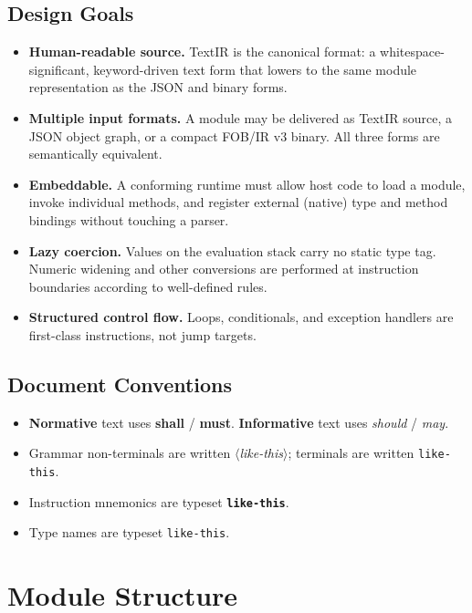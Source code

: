\documentclass[11pt,a4paper]{article}
\newcommand{\typename}[1]{\textcolor{typecolor}{\texttt{\small #1}}}
\newcommand{\opcode}[1]{\textbf{\texttt{#1}}}
\newcommand{\nterm}[1]{\textit{$\langle$#1$\rangle$}}
\newcommand{\term}[1]{\texttt{#1}}
\begin{document}
\subsection{Design Goals}

\begin{itemize}[leftmargin=1.8em]
  \item \textbf{Human-readable source.} TextIR is the canonical format: a
    whitespace-significant, keyword-driven text form that lowers to the same
    module representation as the JSON and binary forms.
  \item \textbf{Multiple input formats.} A module may be delivered as TextIR
    source, a JSON object graph, or a compact FOB/IR v3 binary. All three
    forms are semantically equivalent.
  \item \textbf{Embeddable.} A conforming runtime must allow host code to
    load a module, invoke individual methods, and register external (native)
    type and method bindings without touching a parser.
  \item \textbf{Lazy coercion.} Values on the evaluation stack carry no
    static type tag. Numeric widening and other conversions are performed
    at instruction boundaries according to well-defined rules.
  \item \textbf{Structured control flow.} Loops, conditionals, and exception
    handlers are first-class instructions, not jump targets.
\end{itemize}

\subsection{Document Conventions}

\begin{itemize}[leftmargin=1.8em]
  \item \textbf{Normative} text uses \textbf{shall} / \textbf{must}.
    \textbf{Informative} text uses \textit{should} / \textit{may}.
  \item Grammar non-terminals are written \nterm{like-this}; terminals are
    written \term{like-this}.
  \item Instruction mnemonics are typeset \opcode{like-this}.
  \item Type names are typeset \typename{like-this}.
\end{itemize}

\section{Module Structure}
\label{sec:module}
\end{document}
